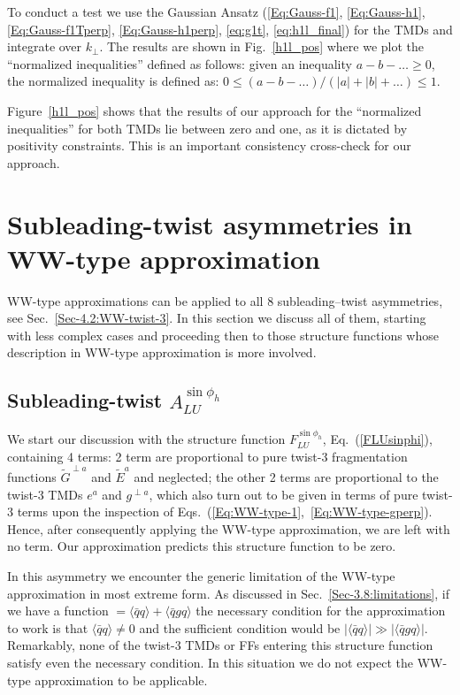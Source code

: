 \documentclass[a4paper,11pt]{article}
\newcommand{\la}{\langle}
\newcommand{\ra}{\rangle}
\begin{document}
To conduct a test we use the Gaussian Ansatz
(\ref{Eq:Gauss-f1}, \ref{Eq:Gauss-h1}, \ref{Eq:Gauss-f1Tperp},
\ref{Eq:Gauss-h1perp}, \ref{eq:g1t}, \ref{eq:h1l_final}) for the
TMDs and integrate over $k_\perp$. The results are shown in
Fig.~\ref{h1l_pos} where we plot the ``normalized inequalities''
defined as follows:
given an inequality $a-b-\dots \ge 0$, the normalized inequality
is defined as: $0 \le (a-b-\dots)/(|a|+|b|+\dots) \le 1$.

Figure~\ref{h1l_pos} shows that the results of our approach for the
``normalized inequalities'' for both TMDs lie between
zero and one, as it is dictated by positivity constraints.
This is an important consistency cross-check for our approach.


\section{Subleading-twist asymmetries in WW-type approximation}
\label{Sec-7:twist-3-and-WW}

WW-type approximations can be applied to all 8 subleading--twist asymmetries,
see Sec.~\ref{Sec-4.2:WW-twist-3}. In this section we discuss all of them,
starting with less complex cases and proceeding then to those structure
functions whose description in WW-type approximation is more involved.

\subsection{\boldmath Subleading-twist  $A_{LU}^{\sin\phi_h}$}
\label{Sec-7.1:FLU}

We start our discussion with the structure function $F_{LU}^{\sin\phi_h}$,
Eq.~(\ref{FLUsinphi}), containing 4 terms:
2 term are proportional to pure twist-3 fragmentation functions
$\tilde{G}^{\perp a}$ and $\tilde{E}^a$ and neglected; the other 2
terms are proportional to the twist-3 TMDs $e^a$ and $g^{\perp a}$, which
also turn out to be given in terms of pure twist-3 terms upon the
inspection of Eqs.~(\ref{Eq:WW-type-1},~\ref{Eq:WW-type-gperp}).
Hence, after consequently applying the WW-type approximation, we are left
with no term. Our approximation predicts this structure function to be zero.

In this asymmetry we encounter the generic limitation of the
WW-type approximation in most extreme form. As discussed in
Sec.~\ref{Sec-3.8:limitations}, if we have a function
$=\la\bar{q}q\ra + \la\bar{q}gq\ra$ the necessary condition for
the approximation to work is that $\la\bar{q}q\ra \neq 0$ and the
sufficient condition would be $|\la\bar{q}q\ra|\gg|\la\bar{q}gq\ra|$.
Remarkably, none of the twist-3 TMDs or FFs entering this structure
function satisfy even the necessary condition. In this situation we
do not expect the WW-type approximation to be applicable.
\end{document}

